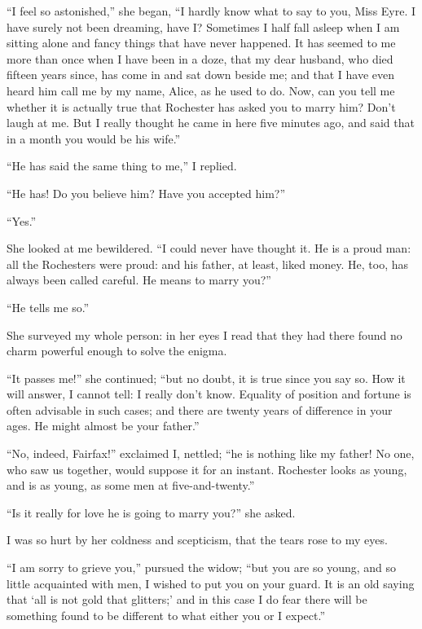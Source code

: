 \enquote{I feel so astonished,} she began, \enquote{I hardly know what
to say to you, Miss Eyre.  I have surely not been dreaming, have I? 
Sometimes I half fall asleep when I am sitting alone and fancy things
that have never happened.  It has seemed to me more than once when I
have been in a doze, that my dear husband, who died fifteen years since,
has come in and sat down beside me; and that I have even heard him call
me by my name, Alice, as he used to do.  Now, can you tell me whether it
is actually true that \Mr{} Rochester has asked you to marry him?  Don't
laugh at me.  But I really thought he came in here five minutes ago, and
said that in a month you would be his wife.}

\enquote{He has said the same thing to me,} I replied.

\enquote{He has!  Do you believe him?  Have you accepted him?}

\enquote{Yes.}

She looked at me bewildered.  \enquote{I could never have thought it. 
He is a proud man: all the Rochesters were proud: and his father, at
least, liked money.  He, too, has always been called careful.  He means
to marry you?}

\enquote{He tells me so.}

She surveyed my whole person: in her eyes I read that they had there
found no charm powerful enough to solve the enigma.

\enquote{It passes me!} she continued; \enquote{but no doubt, it is true
since you say so.  How it will answer, I cannot tell: I really don't
know.  Equality of position and fortune is often advisable in such
cases; and there are twenty years of difference in your ages.  He might
almost be your father.}

\enquote{No, indeed, \Mrs{} Fairfax!} exclaimed I, nettled; \enquote{he is
nothing like my father!  No one, who saw us together, would suppose it
for an instant.  \Mr{} Rochester looks as young, and is as young, as some
men at five-and-twenty.}

\enquote{Is it really for love he is going to marry you?} she asked.

I was so hurt by her coldness and scepticism, that the tears rose to my
eyes.

\enquote{I am sorry to grieve you,} pursued the widow; \enquote{but you
are so young, and so little acquainted with men, I wished to put you on
your guard.  It is an old saying that \enquote{all is not gold that
glitters;} and in this case I do fear there will be something found to
be different to what either you or I expect.}

